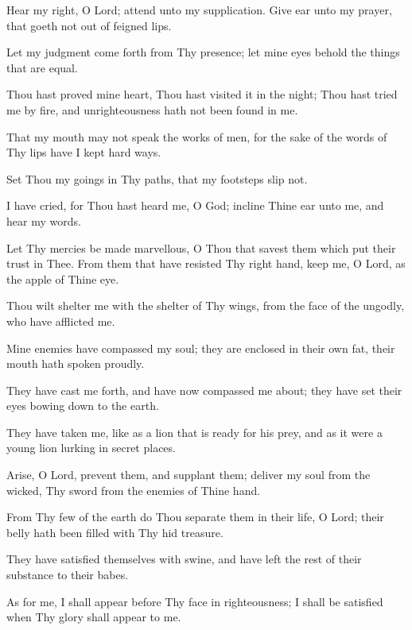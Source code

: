 Hear my right, O Lord; attend unto my supplication. Give ear unto my prayer, that goeth not out of feigned lips.

Let my judgment come forth from Thy presence; let mine eyes behold the things that are equal.

Thou hast proved mine heart, Thou hast visited it in the night; Thou hast tried me by fire, and unrighteousness hath not been found in me.

That my mouth may not speak the works of men, for the sake of the words of Thy lips have I kept hard ways.

Set Thou my goings in Thy paths, that my footsteps slip not.

I have cried, for Thou hast heard me, O God; incline Thine ear unto me, and hear my words.

Let Thy mercies be made marvellous, O Thou that savest them which put their trust in Thee. From them that have resisted Thy right hand, keep me, O Lord, as the apple of Thine eye.

Thou wilt shelter me with the shelter of Thy wings, from the face of the ungodly, who have afflicted me.

Mine enemies have compassed my soul; they are enclosed in their own fat, their mouth hath spoken proudly.

They have cast me forth, and have now compassed me about; they have set their eyes bowing down to the earth.

They have taken me, like as a lion that is ready for his prey, and as it were a young lion lurking in secret places.

Arise, O Lord, prevent them, and supplant them; deliver my soul from the wicked, Thy sword from the enemies of Thine hand.

From Thy few of the earth do Thou separate them in their life, O Lord; their belly hath been filled with Thy hid treasure.

They have satisfied themselves with swine, and have left the rest of their substance to their babes.

As for me, I shall appear before Thy face in righteousness; I shall be satisfied when Thy glory shall appear to me.
